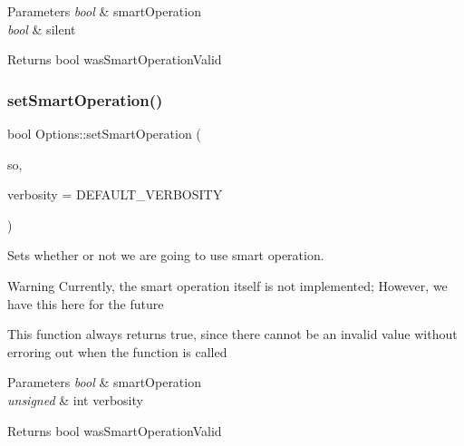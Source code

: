 \begin{DoxyParams}{Parameters}
{\em bool} & smart\+Operation \\
\hline
{\em bool} & silent\\
\hline
\end{DoxyParams}
\begin{DoxyReturn}{Returns}
bool was\+Smart\+Operation\+Valid 
\end{DoxyReturn}
\mbox{\label{classOptions_a0f24b215a0b6d46e3ef31c27766fb1de}} 
\subsubsection{\texorpdfstring{setSmartOperation()}{setSmartOperation()}\hspace{0.1cm}{\footnotesize\ttfamily [2/2]}}
{\footnotesize\ttfamily bool Options\+::set\+Smart\+Operation (\begin{DoxyParamCaption}\item[{bool}]{so,  }\item[{unsigned int}]{verbosity = {\ttfamily DEFAULT\+\_\+VERBOSITY} }\end{DoxyParamCaption})}



Sets whether or not we are going to use smart operation. 

\begin{DoxyWarning}{Warning}
Currently, the smart operation itself is not implemented; However, we have this here for the future
\end{DoxyWarning}
This function always returns true, since there cannot be an invalid value without error\textquotesingle{}ing out when the function is called


\begin{DoxyParams}{Parameters}
{\em bool} & smart\+Operation \\
\hline
{\em unsigned} & int verbosity\\
\hline
\end{DoxyParams}
\begin{DoxyReturn}{Returns}
bool was\+Smart\+Operation\+Valid 
\end{DoxyReturn}
\mbox{\label{classOptions_a506f540031ba61c2aec277b9aecd47ad}} 
